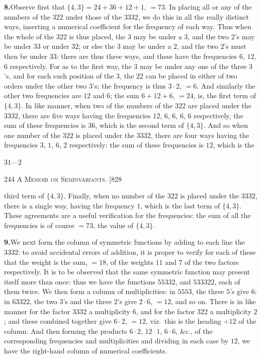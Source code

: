 \documentclass[11pt]{article}
\begin{document}
\medskip
\noindent\textbf{8.}\quad Observe first that $\{4,3\}=24+36+12+1$, $=73$. In placing
all or any of the numbers of the $322$ under those of the $3332$, we do this in all
the really distinct ways, inserting a numerical coefficient for the frequency of each
way. Thus when the whole of the $322$ is thus placed, the $3$ may be under a $3$, and
the two $2$'s may be under $33$ or under $32$; or else the $3$ may be under a $2$, and
the two $2$'s must then be under $33$: there are thus three ways, and these have the
frequencies $6$, $12$, $6$ respectively. For as to the first way, the $3$ may be under
any one of the three $3$'s, and for each such position of the $3$, the $22$ can be
placed in either of two orders under the other two $3$'s; the frequency is thus $3\cdot 2$,
$=6$. And similarly the other two frequencies are $12$ and $6$; the sum $6+12+6$, $=24$,
is, the first term of $\{4,3\}$. In like manner, when two of the numbers of the $322$
are placed under the $3332$, there are five ways having the frequencies $12$, $6$, $6$,
$6$, $6$ respectively, the sum of these frequencies is $36$, which is the second term of
$\{4,3\}$. And so when one number of the $322$ is placed under the $3332$, there are
four ways having the frequencies $3$, $1$, $6$, $2$ respectively: the sum of these
frequencies is $12$, which is the

\hfill $31$---$2$

\newpage
\noindent\textsc{244 \hfill A Memoir on Seminvariants. \hfill [828}
\vspace{0.6em}

\noindent third term of $\{4,3\}$. Finally, when no number of the $322$ is placed under
the $3332$, there is a single way, having the frequency $1$, which is the last term of
$\{4,3\}$. These agreements are a useful verification for the frequencies: the sum of
all the frequencies is of course $=73$, the value of $\{4,3\}$.

\medskip
\noindent\textbf{9.}\quad We next form the column of symmetric functions by adding
to each line the $3332$: to avoid accidental errors of addition, it is proper to
verify for each of these that the weight is the sum, $=18$, of the weights $11$ and
$7$ of the two factors respectively. It is to be observed that the same symmetric
function may present itself more than once: thus we have the functions $55332$, and
$533322$, each of them twice. We then form a column of multiplicities: in $5553$, the
three $5$'s give $6$: in $63322$, the two $3$'s and the three $2$'s give $2\cdot 6$,
$=12$, and so on. There is in like manner for the factor $3332$ a multiplicity $6$,
and for the factor $322$ a multiplicity $2$; and these combined together give $6\cdot 2$,
$=12$, viz.\ this is the heading $\div 12$ of the column. And then forming the
products $6\cdot 2$, $12\cdot 1$, $6\cdot 6$, \&c., of the corresponding frequencies and
multiplicities and dividing in each case by $12$, we have the right-hand column of
numerical coefficients.
\end{document}
